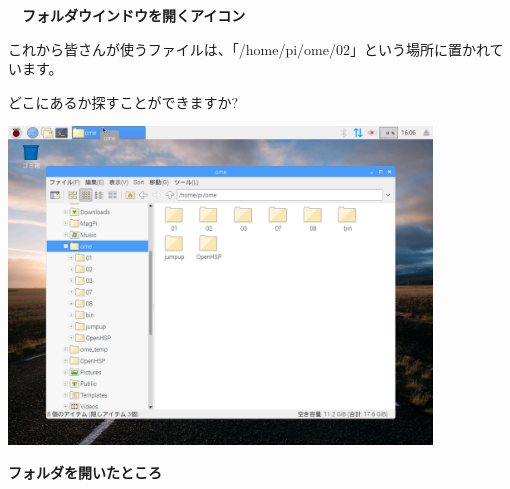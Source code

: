 \documentclass[a4paper,dvipdfmx]{jarticle}
\begin{document}
\bigskip

{\bfseries
　フォルダウインドウを開くアイコン}


\bigskip


\bigskip

これから皆さんが使うファイルは、「/home/pi/ome/02」という場所に置かれています。

どこにあるか探すことができますか?



\begin{center}
\includegraphics[width=11.232cm,height=8.424cm]{text02-img/text02-img002.png}

\end{center}

\bigskip


\bigskip


\bigskip


\bigskip


\bigskip


\bigskip


\bigskip


\bigskip


\bigskip


\bigskip


\bigskip


\bigskip


\bigskip


\bigskip


\bigskip


\bigskip

{\bfseries
フォルダを開いたところ}


\bigskip


\bigskip


\bigskip
\end{document}
